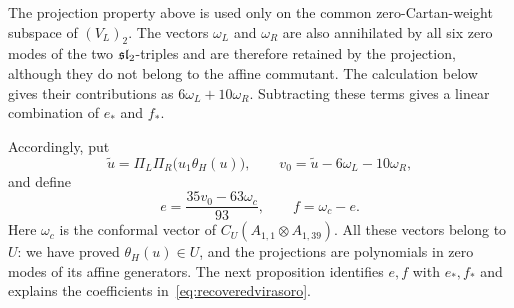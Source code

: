 \documentclass[11pt,reqno]{amsart}
\theoremstyle{definition}\newtheorem{definition}[theorem]{Definition}
\theoremstyle{remark}\newtheorem{remark}[theorem]{Remark}
\numberwithin{equation}{section}
\begin{document}
\begingroup
The projection property above is used only on the common zero-Cartan-weight subspace of $(V_L)_2$. The vectors $\omega_L$ and $\omega_R$ are also annihilated by all six zero modes of the two $\mathfrak{sl}_2$-triples and are therefore retained by the projection, although they do not belong to the affine commutant. The calculation below gives their contributions as $6\omega_L+10\omega_R$. Subtracting these terms gives a linear combination of $e_*$ and $f_*$.
\par\endgroup
Accordingly, put
\begin{equation}\label{eq:cosetprojection}
 \widetilde u=\Pi_L\Pi_R\bigl(u_1\theta_H(u)\bigr),\qquad
 v_0=\widetilde u-6\omega_L-10\omega_R,
\end{equation}
and define
\begin{equation}\label{eq:recoveredvirasoro}
 e=\frac{35v_0-63\omega_c}{93},\qquad
 f=\omega_c-e.
\end{equation}
Here $\omega_c$ is the conformal vector of $C_U(A_{1,1}\otimes A_{1,39})$. All these vectors belong to $U$: we have proved $\theta_H(u)\in U$, and the projections are polynomials in zero modes of its affine generators. The next proposition identifies $e,f$ with $e_*,f_*$ and explains the coefficients in~\eqref{eq:recoveredvirasoro}.
\end{document}
